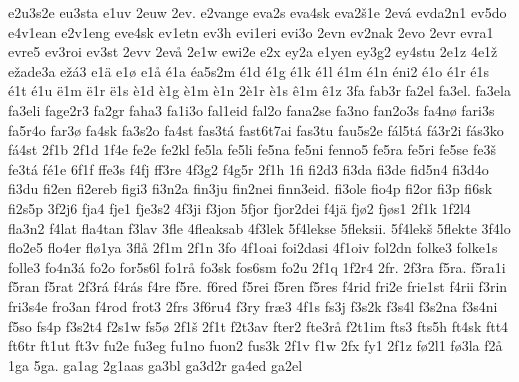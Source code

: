 {    e2u3s2e
    eu3sta
    e1uv
    2euw
    2ev.
    e2vange
    eva2s
    eva4sk
    eva2š1e
    2evá
    evda2n1
    ev5do
    e4v1ean
    e2v1eng
    eve4sk
    ev1etn
    ev3h
    evi1eri
    evi3o
    2evn
    ev2nak
    2evo
    2evr
    evra1
    evre5
    ev3roi
    ev3st
    2evv
    2evå
    2e1w
    ewi2e
    e2x
    ey2a
    e1yen
    ey3g2
    ey4stu
    2e1z
    4e1ž
    ežade3a
    ežá3
    e1ä
    e1ø
    e1å
    é1a
    éa5s2m
    é1d
    é1g
    é1k
    é1l
    é1m
    é1n
    éni2
    é1o
    é1r
    é1s
    é1t
    é1u
    ë1m
    ë1r
    ë1s
    è1d
    è1g
    è1m
    è1n
    2è1r
    è1s
    ê1m
    ê1z
    3fa
    fab3r
    fa2el
    fa3el.
    fa3ela
    fa3eli
    fage2r3
    fa2gr
    faha3
    fa1i3o
    fal1eid
    fal2o
    fana2se
    fa3no
    fan2o3s
    fa4nø
    fari3s
    fa5r4o
    far3ø
    fa4sk
    fa3s2o
    fa4st
    fas3tá
    fast6t7ai
    fas3tu
    fau5s2e
    fál5tá
    fá3r2i
    fás3ko
    fá4st
    2f1b
    2f1d
    1f4e
    fe2e
    fe2kl
    fe5la
    fe5li
    fe5na
    fe5ni
    fenno5
    fe5ra
    fe5ri
    fe5se
    fe3š
    fe3tá
    fé1e
    6f1f
    ffe3s
    f4fj
    ff3re
    4f3g2
    f4g5r
    2f1h
    1fi
    fi2d3
    fi3da
    fi3de
    fid5n4
    fi3d4o
    fi3du
    fi2en
    fi2ereb
    figi3
    fi3n2a
    fin3ju
    fin2nei
    finn3eid.
    fi3ole
    fio4p
    fi2or
    fi3p
    fi6sk
    fi2s5p
    3f2j6
    fja4
    fje1
    fje3s2
    4f3ji
    f3jon
    5fjor
    fjor2dei
    f4jä
    fjø2
    fjøs1
    2f1k
    1f2l4
    fla3n2
    f4lat
    fla4tan
    f3lav
    3fle
    4fleaksab
    4f3lek
    5f4lekse
    5fleksii.
    5f4lekš
    5flekte
    3f4lo
    flo2e5
    flo4er
    flø1ya
    3flå
    2f1m
    2f1n
    3fo
    4f1oai
    foi2dasi
    4f1oiv
    fol2dn
    folke3
    folke1s
    folle3
    fo4n3á
    fo2o
    for5s6l
    fo1rå
    fo3sk
    fos6sm
    fo2u
    2f1q
    1f2r4
    2fr.
    2f3ra
    f5ra.
    f5ra1i
    f5ran
    f5rat
    2f3rá
    f4rás
    f4re
    f5re.
    f6red
    f5rei
    f5ren
    f5res
    f4rid
    fri2e
    frie1st
    f4rii
    f3rin
    fri3s4e
    fro3an
    f4rod
    frot3
    2frs
    3f6ru4
    f3ry
    fræ3
    4f1s
    fs3j
    f3s2k
    f3s4l
    f3s2na
    f3s4ni
    f5so
    fs4p
    f3s2t4
    f2s1w
    fs5ø
    2f1š
    2f1t
    f2t3av
    fter2
    fte3rå
    f2t1im
    fts3
    fts5h
    ft4sk
    ftt4
    ft6tr
    ft1ut
    ft3v
    fu2e
    fu3eg
    fu1no
    fuon2
    fus3k
    2f1v
    f1w
    2fx
    fy1
    2f1z
    fø2l1
    fø3la
    f2å
    1ga
    5ga.
    ga1ag
    2g1aas
    ga3bl
    ga3d2r
    ga4ed
    ga2el
}
